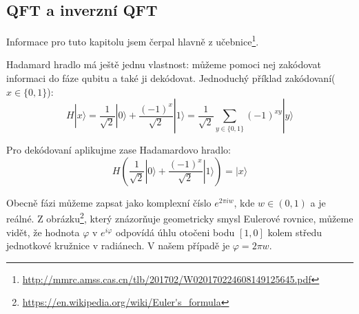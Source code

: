 \documentclass[11pt]{article}
\begin{document}
\subsection{QFT a inverzní QFT}
\label{sec:qft}
Informace pro tuto kapitolu jsem čerpal hlavně z učebnice\footnote{\url{http://mmrc.amss.cas.cn/tlb/201702/W020170224608149125645.pdf}}.
\par Hadamard hradlo má ještě jednu vlastnost: můžeme pomoci nej zakódovat informaci do fáze qubitu a také ji dekódovat.
Jednoduchý příklad zakódovaní($x\in\{0,1\}$):
$$H|x\rangle = \frac{1}{\sqrt{2}}|0\rangle + \frac{(-1)^x}{\sqrt{2}}|1\rangle = \frac{1}{\sqrt{2}}\displaystyle\sum_{y\in\{0, 1\}} (-1)^{xy}|y\rangle$$
\par Pro dekódovaní aplikujme zase Hadamardovo hradlo:
$$H\left(\frac{1}{\sqrt{2}}|0\rangle + \frac{(-1)^x}{\sqrt{2}}|1\rangle\right) = |x\rangle$$
\par Obecně fázi můžeme zapsat jako komplexní číslo $e^{2\pi i w}$, kde $w\in(0, 1)$ a je reálné.
Z obrázku\footnote{\url{https://en.wikipedia.org/wiki/Euler's_formula}}, který znázorňuje geometricky smysl Eulerové rovnice,
můžeme vidět, že hodnota $\varphi$ v $e^{i\varphi}$ odpovídá úhlu otočeni bodu $[1, 0]$ kolem středu jednotkové kružnice v radiánech.
V našem případě je $\varphi = 2\pi w$.
\end{document}

